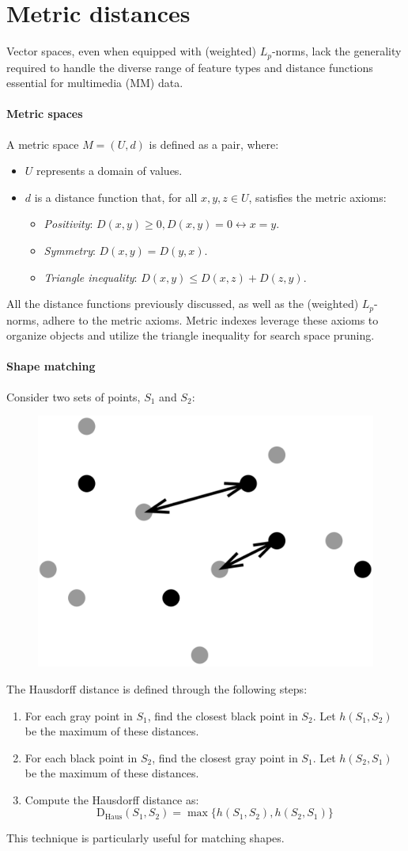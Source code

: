 \section{Metric distances}

Vector spaces, even when equipped with (weighted) $L_p$-norms, lack the generality required to handle the diverse range of feature types and distance functions essential for multimedia (MM) data.

\paragraph*{Metric spaces}
A metric space $M = (U,d)$ is defined as a pair, where:
\begin{itemize}
    \item $U$ represents a domain of values.
    \item $d$ is a distance function that, for all $x, y, z \in U$, satisfies the metric axioms:
        \begin{itemize}
            \item \textit{Positivity}: $D(x,y) \geq 0, D(x,y) = 0 \leftrightarrow x = y$.
            \item \textit{Symmetry}: $D(x,y) = D(y,x)$. 
            \item \textit{Triangle inequality}: $D(x,y) \leq D(x,z) + D(z,y)$. 
        \end{itemize}
\end{itemize}
All the distance functions previously discussed, as well as the (weighted) $L_p$-norms, adhere to the metric axioms. 
Metric indexes leverage these axioms to organize objects and utilize the triangle inequality for search space pruning.

\paragraph*{Shape matching}
Consider two sets of points, $S_1$ and $S_2$:
\begin{figure}[H]
    \centering
    \includegraphics[width=0.25\linewidth]{images/hd.png}
\end{figure}
The Hausdorff distance is defined through the following steps:
\begin{enumerate}
    \item For each gray point in $S_1$, find the closest black point in $S_2$. 
        Let $h(S_1,S_2)$ be the maximum of these distances.
    \item For each black point in $S_2$, find the closest gray point in $S_1$. 
        Let $h(S_2,S_1)$ be the maximum of these distances.
    \item Compute the Hausdorff distance as:
        \[\text{D}_{\text{Haus}}(S_1,S_2) = \max\{ h(S_1,S_2),h(S_2,S_1)\}\]
\end{enumerate}
This technique is particularly useful for matching shapes.

